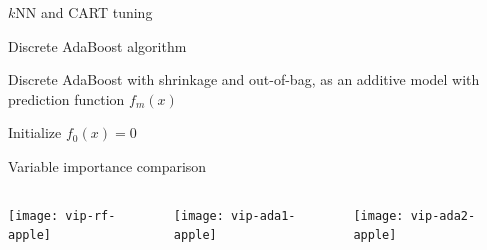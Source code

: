 
\begin{frame}{$k\text{NN}$ and CART tuning}


\end{frame}


\begin{frame}[fragile]{Discrete AdaBoost algorithm}

Discrete AdaBoost with shrinkage and out-of-bag, as an additive model with prediction function $f_m(x)$

{%
\setlength{\interspacetitleruled}{0pt}%
\setlength{\algotitleheightrule}{0pt}%
\begin{algorithm}[H]
Initialize $f_0(x)=0$\;
\end{algorithm}}

\end{frame}


\begin{frame}{Variable importance comparison}

\begin{columns}[T]
\hspace*{-4.1em}%
\begin{column}{0.3\textwidth}
	\texttt{[image: vip-rf-apple]}
\end{column}
\hspace*{-0.4em}%
\begin{column}{0.3\textwidth}
	\texttt{[image: vip-ada1-apple]}
\end{column}
\hspace*{-0.4em}%
\begin{column}{0.3\textwidth}
	\texttt{[image: vip-ada2-apple]}
\end{column}
\end{columns}

\end{frame}

